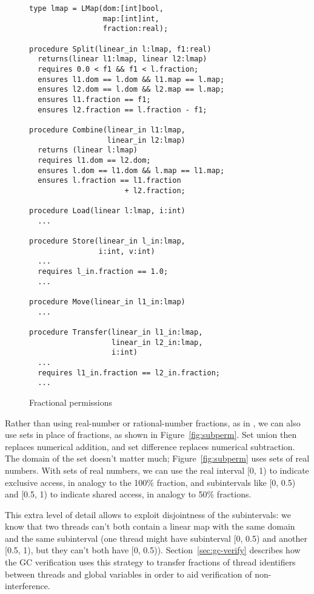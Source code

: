 \begin{figure}
\begin{verbatim}
type lmap = LMap(dom:[int]bool,
                 map:[int]int,
                 fraction:real);

procedure Split(linear_in l:lmap, f1:real)
  returns(linear l1:lmap, linear l2:lmap)
  requires 0.0 < f1 && f1 < l.fraction;
  ensures l1.dom == l.dom && l1.map == l.map;
  ensures l2.dom == l.dom && l2.map == l.map;
  ensures l1.fraction == f1;
  ensures l2.fraction == l.fraction - f1;

procedure Combine(linear_in l1:lmap,
                  linear_in l2:lmap)
  returns (linear l:lmap)
  requires l1.dom == l2.dom;
  ensures l.dom == l1.dom && l.map == l1.map;
  ensures l.fraction == l1.fraction
                      + l2.fraction;

procedure Load(linear l:lmap, i:int) 
  ...

procedure Store(linear_in l_in:lmap,
                i:int, v:int) 
  ...
  requires l_in.fraction == 1.0;
  ...

procedure Move(linear_in l1_in:lmap) 
  ...

procedure Transfer(linear_in l1_in:lmap, 
                   linear_in l2_in:lmap,
                   i:int) 
  ...
  requires l1_in.fraction == l2_in.fraction;
  ...
\end{verbatim}
\caption{Fractional permissions}
\label{fig:fracperm}
\end{figure}

Rather than using real-number or rational-number fractions,
as in \cite{boyland:03fractions},
we can also use sets in place of fractions,
as shown in Figure~\ref{fig:subperm}.
Set union then replaces numerical addition,
and set difference replaces numerical subtraction.
The domain of the set doesn't matter much;
Figure~\ref{fig:subperm} uses sets of real numbers.
With sets of real numbers,
we can use the real interval [0, 1) to indicate exclusive access,
in analogy to the 100\% fraction, and subintervals like [0, 0.5) and [0.5, 1)
to indicate shared access, in analogy to 50\% fractions.

This extra level of detail allows \civl to exploit disjointness of the subintervals:
we know that two threads can't both contain a linear map with the same domain and the same subinterval
(one thread might have subinterval [0, 0.5) and another [0.5, 1), but they can't both have [0, 0.5)).
Section~\ref{sec:gc-verify} describes how the GC verification uses this strategy
to transfer fractions of thread identifiers between threads and global variables
in order to aid verification of non-interference.

